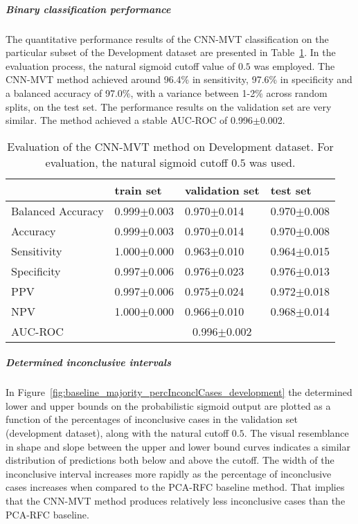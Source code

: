 \subparagraph{Binary classification performance}

The quantitative performance results of the CNN-MVT classification on the 
particular subset of the Development dataset are presented in Table~\ref{t1:cnn_mvt_perf_eval_table}.
In the evaluation process, the natural sigmoid cutoff value of $0.5$ was employed.
The CNN-MVT method achieved around 96.4\% in sensitivity, 97.6\% in specificity and a balanced accuracy of 97.0\%, 
with a variance between 1-2\% across random splits, on the test set.
The performance results on the validation set are very similar.
The method achieved a stable AUC-ROC of 0.996$\pm$0.002.


\begin{table}[ht]
  \caption{Evaluation of the CNN-MVT method on Development dataset. 
  For evaluation, the natural sigmoid cutoff $0.5$ was used.}
  \centering
  \begin{tabular}{llll}
      \hline
                        & train set         & validation set      & test set             \\
      \hline
      Balanced Accuracy & 0.999$\pm$0.003   &  0.970$\pm$0.014    &  0.970$\pm$0.008   \\
      Accuracy          & 0.999$\pm$0.003    &   0.970$\pm$0.014   &  0.970$\pm$0.008   \\
      Sensitivity       &  1.000$\pm$0.000   &   0.963$\pm$0.010   &  0.964$\pm$0.015  \\
      Specificity       &   0.997$\pm$0.006   &   0.976$\pm$0.023  &   0.976$\pm$0.013  \\
      PPV               &  0.997$\pm$0.006   &   0.975$\pm$0.024   &  0.972$\pm$0.018 \\
      NPV               &  1.000$\pm$0.000    &   0.966$\pm$0.010   & 0.968$\pm$0.014  \\
      \hline
      AUC-ROC          &  \multicolumn{3}{c}{0.996$\pm$0.002}  \\
      \hline
  \end{tabular}
 \label{t1:cnn_mvt_perf_eval_table}
\end{table}

\subparagraph{Determined inconclusive intervals}

In Figure~\ref{fig:baseline_majority_percInconclCases_development} the determined lower and upper bounds on the 
probabilistic sigmoid output are plotted as a function of the percentages of inconclusive cases 
in the validation set (development dataset), along with the natural cutoff $0.5$.
The visual resemblance in shape and slope between the upper and lower bound curves 
indicates a similar distribution of predictions both below and above the cutoff.
The width of the inconclusive interval increases more rapidly as the percentage of inconclusive cases increases 
when compared to the PCA-RFC baseline method.
That implies that the CNN-MVT method produces relatively less inconclusive cases than the PCA-RFC baseline.


